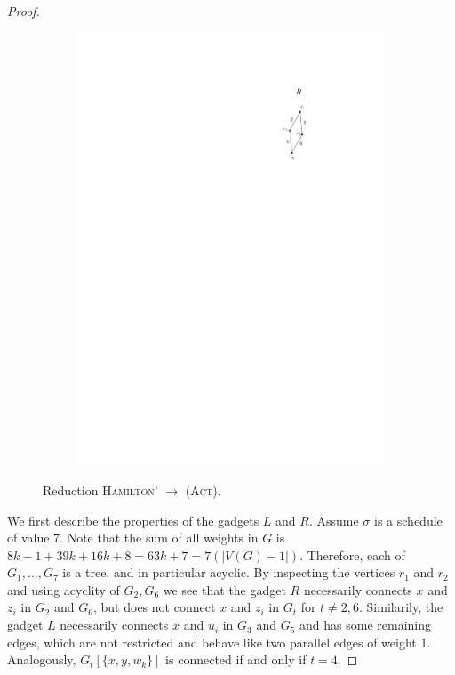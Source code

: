 \documentclass[runningheads]{llncs}
\numberwithin{equation}{section}
\newcommand{\set}[1]{\{ #1 \}}
\newcommand{\act}{\textsc{(Act)}}
\begin{document}
\begin{proof}
\begin{figure}[htpb]
\begin{subfigure}[b]{0.15\textwidth}
         \includegraphics[scale=1]{img/act-hamilton-cycle-c}
     \end{subfigure}
        \caption{Reduction \textsc{Hamilton'} $\rightarrow$ {\act}.}
        \label{fig_act_hamilton_cycle}
\end{figure}

We first describe the properties of the gadgets $L$ and $R$. Assume $\sigma$ is a schedule of value 7. Note that the sum of all weights in $G$ is $8k - 1 + 39k + 16k + 8 = 63k + 7 = 7(|V(G) - 1|)$. Therefore, each of $G_{1}, \ldots, G_{7}$ is a tree, and in particular acyclic. By inspecting the vertices $r_1$ and $r_2$ and using acyclity of $G_2, G_6$ we see that the gadget $R$ necessarily connects $x$ and $z_i$ in $G_2$ and $G_6$, but does not connect $x$ and $z_i$ in $G_t$ for $t \neq 2,6$. Similarily, the gadget $L$ necessarily connects $x$ and $u_i$ in $G_3$ and $G_5$ and has some remaining edges, which are not restricted and behave like two parallel edges of weight 1. Analogously, $G_{t}[\set{x, y, w_k}]$ is connected if and only if $t = 4$.


\end{proof}
\end{document}
